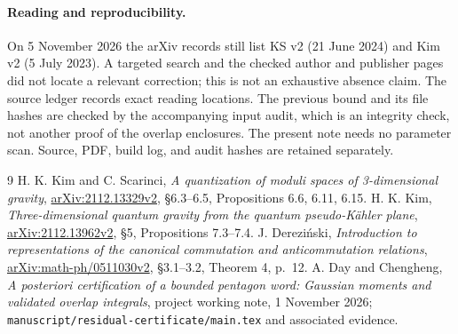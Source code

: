 \documentclass[11pt,a4paper]{article}
\begin{document}
\paragraph{Reading and reproducibility.}
On 5 November 2026 the arXiv records still list KS v2 (21 June 2024)
and Kim v2 (5 July 2023). A targeted search and the checked author and
publisher pages did not locate a relevant correction; this is not an
exhaustive absence claim. The source ledger records exact reading
locations. The previous bound and its file hashes are checked by the
accompanying input audit, which is an integrity check, not another
proof of the overlap enclosures. The present note needs no parameter
scan. Source, PDF, build log, and audit hashes are retained separately.

\begin{thebibliography}{9}\small
{} H. K. Kim and C. Scarinci,
\emph{A quantization of moduli spaces of 3-dimensional gravity},
\href{https://arxiv.org/abs/2112.13329v2}{arXiv:2112.13329v2},
\S6.3--6.5, Propositions 6.6, 6.11, 6.15.
 H. K. Kim, \emph{Three-dimensional quantum gravity from
the quantum pseudo-K\"ahler plane},
\href{https://arxiv.org/abs/2112.13962v2}{arXiv:2112.13962v2},
\S5, Propositions 7.3--7.4.
 J. Derezi\'nski, \emph{Introduction to
representations of the canonical commutation and anticommutation
relations}, \href{https://arxiv.org/abs/math-ph/0511030v2}{arXiv:math-ph/0511030v2},
\S3.1--3.2, Theorem 4, p.~12.
 A. Day and Chengheng, \emph{A posteriori certification
of a bounded pentagon word: Gaussian moments and validated overlap
integrals}, project working note, 1 November 2026;
\texttt{manuscript/residual-certificate/main.tex} and associated evidence.
\end{thebibliography}
\end{document}

